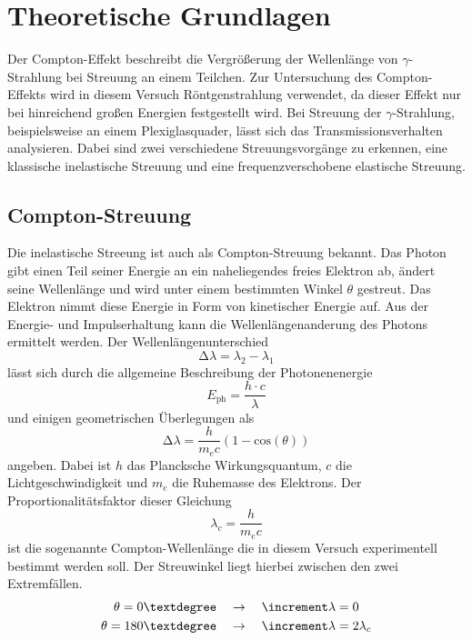 \section{Theoretische Grundlagen}
Der Compton-Effekt beschreibt die Vergrößerung der Wellenlänge von $\gamma$-Strahlung bei Streuung an einem Teilchen. Zur Untersuchung
des Compton-Effekts wird in diesem Versuch Röntgenstrahlung verwendet, da dieser Effekt nur bei hinreichend großen Energien festgestellt wird.
Bei Streuung der $\gamma$-Strahlung, beispielsweise an einem Plexiglasquader, lässt sich das Transmissionsverhalten analysieren. Dabei
sind zwei verschiedene Streuungsvorgänge zu erkennen, eine klassische inelastische Streuung und eine frequenzverschobene elastische Streuung.
\\
\subsection{Compton-Streuung}
Die inelastische Streeung ist auch als Compton-Streuung bekannt. Das Photon gibt einen Teil seiner Energie an ein naheliegendes freies Elektron ab, ändert seine Wellenlänge und wird unter einem 
bestimmten Winkel $\theta$ gestreut. Das Elektron nimmt diese Energie in Form von kinetischer Energie auf. Aus der Energie- und Impulserhaltung kann die Wellenlängenanderung des Photons ermittelt werden.
Der Wellenlängenunterschied
\begin{equation}
\label{eqn:diff}
\increment \lambda = \lambda_{2} - \lambda_{1}
\end{equation}
lässt sich durch die allgemeine Beschreibung der Photonenenergie
\begin{equation}
\label{eqn:photoneneq}
E_{\text{ph}} = \frac{h \cdot c}{\lambda}
\end{equation}
und einigen geometrischen Überlegungen als
\begin{equation}
\increment \lambda = \frac{h}{m_{e} c}(1-\text{cos}(\theta))
\end{equation}
angeben. Dabei ist $h$ das Plancksche Wirkungsquantum, $c$ die Lichtgeschwindigkeit und $m_{e}$ die Ruhemasse des Elektrons.
Der Proportionalitätsfaktor dieser Gleichung
\begin{equation}
\label{eqn:comptonwavelength}
\lambda_{c} = \frac{h}{m_{e} c}
\end{equation}
ist die sogenannte Compton-Wellenlänge die in diesem Versuch experimentell bestimmt werden soll. Der Streuwinkel liegt hierbei zwischen den
zwei Extremfällen. 
\begin{align*}
\theta = 0\textdegree \quad &\to \quad \increment \lambda = 0 \\
\theta = 180\textdegree \quad &\to \quad \increment \lambda = 2 \lambda_{c}
\end{align*}
